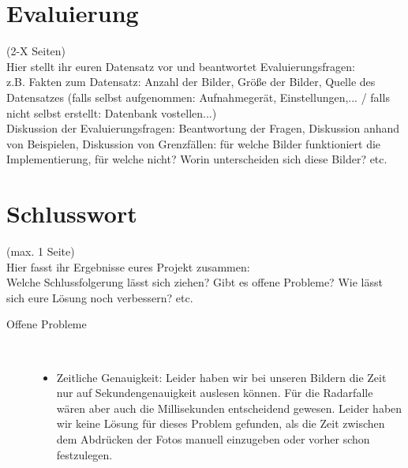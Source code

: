\documentclass[deutsch]{scrartcl}
\begin{document}
\section{Evaluierung}
(2-X Seiten)\\
Hier stellt ihr euren Datensatz vor und beantwortet Evaluierungsfragen:\\
z.B. Fakten zum Datensatz: Anzahl der Bilder, Größe der Bilder, Quelle des Datensatzes (falls selbst aufgenommen: Aufnahmegerät, Einstellungen,... / falls nicht selbst erstellt: Datenbank vostellen...)\\
Diskussion der Evaluierungsfragen: Beantwortung der Fragen, Diskussion anhand von Beispielen, Diskussion von Grenzfällen: für welche Bilder funktioniert die Implementierung, für welche nicht? Worin unterscheiden sich diese Bilder? etc.

\section{Schlusswort}
(max. 1 Seite)\\
Hier fasst ihr Ergebnisse eures Projekt zusammen:\\
Welche Schlussfolgerung lässt sich ziehen? Gibt es offene Probleme? Wie lässt sich eure Lösung noch verbessern? etc.

\begin{description}
	\item[Offene Probleme] ~\par
	\begin{itemize}
		\item Zeitliche Genauigkeit: Leider haben wir bei unseren Bildern die Zeit nur auf Sekundengenauigkeit auslesen können. Für die Radarfalle wären aber auch die Millisekunden entscheidend gewesen. Leider haben wir keine Lösung für dieses Problem gefunden, als die Zeit zwischen dem Abdrücken der Fotos manuell einzugeben oder vorher schon festzulegen.
	\end{itemize}
\end{description}




\nocite{*}

\end{document}

